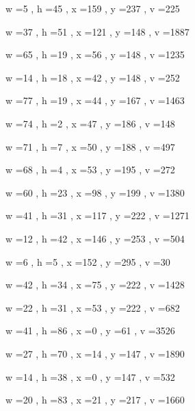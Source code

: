 \documentclass[11pt]{article}
\begin{document}
\par
w =5 , h =45 , x =159 , y =237 , v =225
\par
w =37 , h =51 , x =121 , y =148 , v =1887
\par
w =65 , h =19 , x =56 , y =148 , v =1235
\par
w =14 , h =18 , x =42 , y =148 , v =252
\par
w =77 , h =19 , x =44 , y =167 , v =1463
\par
w =74 , h =2 , x =47 , y =186 , v =148
\par
w =71 , h =7 , x =50 , y =188 , v =497
\par
w =68 , h =4 , x =53 , y =195 , v =272
\par
w =60 , h =23 , x =98 , y =199 , v =1380
\par
w =41 , h =31 , x =117 , y =222 , v =1271
\par
w =12 , h =42 , x =146 , y =253 , v =504
\par
w =6 , h =5 , x =152 , y =295 , v =30
\par
w =42 , h =34 , x =75 , y =222 , v =1428
\par
w =22 , h =31 , x =53 , y =222 , v =682
\par
w =41 , h =86 , x =0 , y =61 , v =3526
\par
w =27 , h =70 , x =14 , y =147 , v =1890
\par
w =14 , h =38 , x =0 , y =147 , v =532
\par
w =20 , h =83 , x =21 , y =217 , v =1660
\par
\newpage
\end{document}
